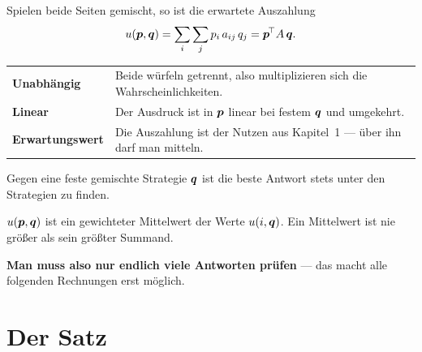 \begin{merksatz}
Spielen beide Seiten gemischt, so ist die erwartete Auszahlung
\[ u(\boldsymbol{p},\boldsymbol{q}) = \sum_{i}\sum_{j} p_i\,a_{ij}\,q_j = \boldsymbol{p}^{\!\top} A\,\boldsymbol{q} . \]

\begin{center}
{\small
\renewcommand{\arraystretch}{1.5}
\begin{tabular}{@{}P{2.8cm}P{5.8cm}@{}}
\toprule
\textbf{Unabhängig} & Beide würfeln getrennt, also multiplizieren sich die Wahrscheinlichkeiten.\\
\textbf{Linear} & Der Ausdruck ist in $\boldsymbol{p}$ linear bei festem $\boldsymbol{q}$ und umgekehrt.\\
\textbf{Erwartungswert} & Die Auszahlung ist der Nutzen aus Kapitel~1 --- über ihn darf man mitteln.\\
\bottomrule
\end{tabular}}
\end{center}

\begin{center}
\begin{minipage}{0.88\textwidth}
\end{minipage}
\end{center}

Gegen eine feste gemischte Strategie $\boldsymbol{q}$ ist die beste Antwort stets unter den  Strategien zu finden.

 $u(\boldsymbol{p},\boldsymbol{q})$ ist ein gewichteter Mittelwert der Werte $u(i,\boldsymbol{q})$. Ein Mittelwert ist nie größer als sein größter Summand.

\begin{center}
\begin{minipage}{0.9\textwidth}
\textbf{Man muss also nur endlich viele Antworten prüfen} --- das macht alle folgenden Rechnungen erst möglich.
\end{minipage}
\end{center}
\end{merksatz}

\section{Der Satz}

